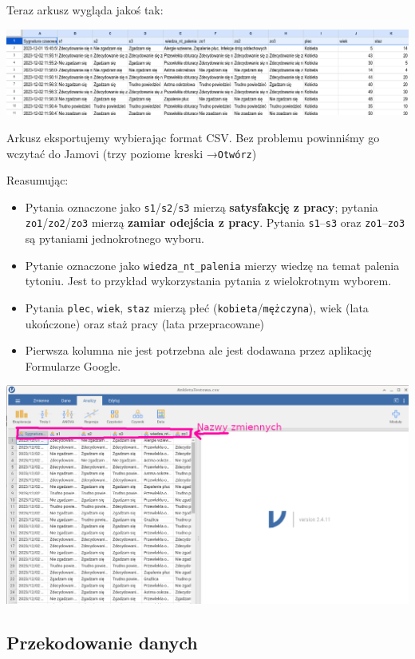 \documentclass[
  openany]{book}
\begin{document}
Teraz arkusz wygląda jakoś tak:

\includegraphics{./GoogleFormsTestHdr.png}

Arkusz eksportujemy wybierając format CSV. Bez problemu powinniśmy
go wczytać do Jamovi (trzy poziome kreski →\texttt{Otwórz})

Reasumując:

\begin{itemize}
\item
  Pytania oznaczone jako \texttt{s1}/\texttt{s2}/\texttt{s3} mierzą
  \textbf{satysfakcję z pracy}; pytania \texttt{zo1}/\texttt{zo2}/\texttt{zo3} mierzą \textbf{zamiar odejścia
  z pracy}. Pytania \texttt{s1}--\texttt{s3} oraz \texttt{zo1}--\texttt{zo3} są pytaniami jednokrotnego wyboru.
\item
  Pytanie oznaczone jako \texttt{wiedza\_nt\_palenia} mierzy wiedzę na temat palenia tytoniu.
  Jest to przykład wykorzystania pytania z wielokrotnym wyborem.
\item
  Pytania \texttt{plec}, \texttt{wiek}, \texttt{staz} mierzą płeć (\texttt{kobieta}/\texttt{mężczyna}), wiek (lata ukończone)
  oraz staż pracy (lata przepracowane)
\item
  Pierwsza kolumna nie jest potrzebna ale jest dodawana przez aplikację Formularze Google.
\end{itemize}

\includegraphics{./Jamovi_data_import.png}

\hypertarget{przekodowanie-danych}{%
\subsection{Przekodowanie danych}\label{przekodowanie-danych}}
\end{document}
